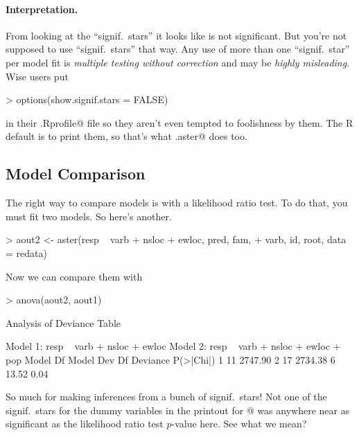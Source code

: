 \documentclass[11pt]{article}
\begin{document}
\paragraph{Interpretation.} From looking at the ``signif.\ stars''
it looks like \verb@pop@ is not significant.  But you're not supposed
to use ``signif.\ stars'' that way.  Any use of more than one
``signif.\ star'' per model fit is \emph{multiple testing without correction}
and may be \emph{highly misleading}.  Wise users put
\begin{Schunk}
\begin{Sinput}
> options(show.signif.stars = FALSE)
\end{Sinput}
\end{Schunk}
in their \verb@.Rprofile@ file so they aren't even tempted to foolishness
by them.  The R default is to print them, so that's what \verb@summary.aster@
does too.

\subsection{Model Comparison}

The right way to compare models is with a likelihood ratio test.
To do that, you must fit two models.  So here's another.
\begin{Schunk}
\begin{Sinput}
> aout2 <- aster(resp ~ varb + nsloc + ewloc, pred, fam, 
+     varb, id, root, data = redata)
\end{Sinput}
\end{Schunk}
Now we can compare them with
\begin{Schunk}
\begin{Sinput}
> anova(aout2, aout1)
\end{Sinput}
\begin{Soutput}
Analysis of Deviance Table

Model 1: resp ~ varb + nsloc + ewloc
Model 2: resp ~ varb + nsloc + ewloc + pop
  Model Df Model Dev Df Deviance P(>|Chi|)
1       11   2747.90                      
2       17   2734.38  6    13.52      0.04
\end{Soutput}
\end{Schunk}

So much for making inferences from a bunch of signif.\ stars!
Not one of the signif.\ stars for the \verb@pop@ dummy variables
in the printout for @ was anywhere near as significant
as the likelihood ratio test $p$-value here.  See what we mean?
\end{document}
